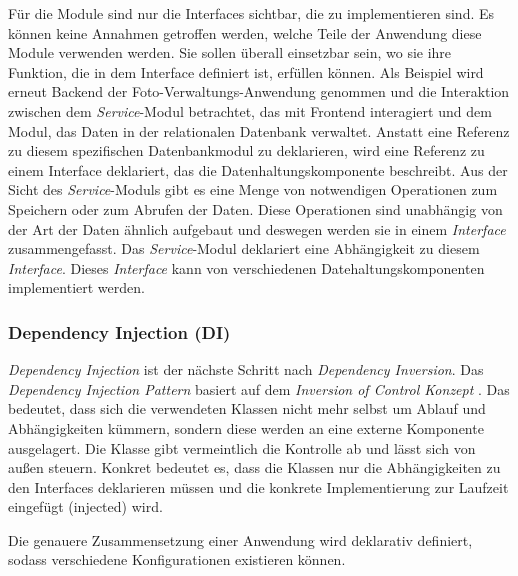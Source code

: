 \begin{itemize}
Für die Module sind nur die Interfaces sichtbar, die zu implementieren sind. Es können keine Annahmen getroffen werden, welche Teile der Anwendung diese Module verwenden werden. Sie sollen überall einsetzbar sein, wo sie ihre Funktion, die in dem Interface definiert ist, erfüllen können. Als Beispiel wird erneut Backend der Foto-Verwaltungs-Anwendung genommen und die Interaktion zwischen dem \textit{Service}-Modul betrachtet, das mit Frontend interagiert und dem Modul, das Daten in der relationalen Datenbank verwaltet. Anstatt eine Referenz zu diesem spezifischen Datenbankmodul zu deklarieren, wird eine Referenz zu einem Interface deklariert, das die Datenhaltungskomponente beschreibt. Aus der Sicht des \textit{Service}-Moduls gibt es eine Menge von notwendigen Operationen zum Speichern oder zum Abrufen der Daten. Diese Operationen sind unabhängig von der Art der Daten ähnlich aufgebaut und deswegen werden sie in einem \textit{Interface} zusammengefasst. Das \textit{Service}-Modul deklariert eine Abhängigkeit zu diesem \textit{Interface}. Dieses \textit{Interface} kann von verschiedenen Datehaltungskomponenten implementiert werden.

\end{itemize}

\subsubsection{Dependency Injection (DI)}\label{di}

\textit{Dependency Injection} \cite{DIEinfuehrung} ist der nächste Schritt nach \textit{Dependency Inversion}. Das \textit{Dependency Injection Pattern} basiert auf dem \textit{Inversion of Control Konzept} \cite{MartinFowlerTwo}. Das bedeutet, dass sich die verwendeten Klassen nicht mehr selbst um Ablauf und Abhängigkeiten kümmern, sondern diese werden an eine externe Komponente ausgelagert. Die Klasse gibt vermeintlich die Kontrolle ab und lässt sich von außen steuern. Konkret bedeutet es, dass die Klassen nur die Abhängigkeiten zu den Interfaces deklarieren müssen und die konkrete Implementierung zur Laufzeit eingefügt (injected) wird. 

Die genauere Zusammensetzung einer Anwendung wird deklarativ definiert, sodass verschiedene Konfigurationen existieren können.

